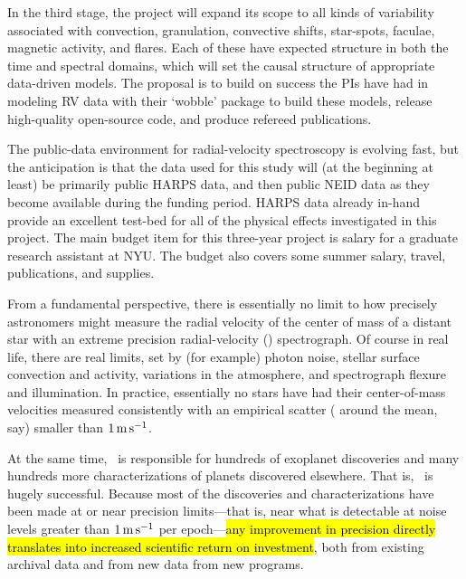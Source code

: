 \documentclass[12pt, fullpage, letterpaper]{article}
\begin{document}
In the third stage, the project will expand its scope to all kinds of variability associated with convection, granulation, convective shifts, star-spots, faculae, magnetic activity, and flares. Each of these have expected structure in both the time and spectral domains, which will set the causal structure of appropriate data-driven models. The proposal is to build on success the PIs have had in modeling RV data with their ‘wobble’ package to build these models, release high-quality open-source code, and produce refereed publications. 

The public-data environment for radial-velocity spectroscopy is evolving fast, but the anticipation is that the data used for this study will (at the beginning at least) be primarily public HARPS data, and then public NEID data as they become available during the funding period. HARPS data already in-hand provide an excellent test-bed for all of the physical effects investigated in this project. The main budget item for this three-year project is salary for a graduate research assistant at NYU. The budget also covers some summer salary, travel, publications, and supplies.


\noindent
From a fundamental perspective, there is essentially no limit to how
precisely astronomers might measure the radial velocity of the center of mass
of a distant star with an extreme precision radial-velocity (\EPRV) spectrograph.
Of course in real life, there are real limits, set
by (for example) photon noise, stellar surface convection and activity,
variations in the atmosphere, and spectrograph flexure and illumination. In practice,
essentially no stars have had their center-of-mass velocities measured
consistently with an empirical scatter ( around the mean,
say) smaller than $1\,{\mathrm{m\,s^{-1}}}$.

At the same time, \EPRV\ is responsible for hundreds of 
exoplanet discoveries and many hundreds more 
characterizations of planets
discovered elsewhere. That is, \EPRV\ is hugely successful.
Because most of the discoveries and characterizations have been made
at or near precision limits---that is, near what is detectable at noise levels
greater than $1\,{\mathrm{m\,s^{-1}}}$ per epoch---\hl{any improvement in precision directly
translates into increased scientific return on investment},
both from existing archival data and from new data from new programs.

\end{document}
